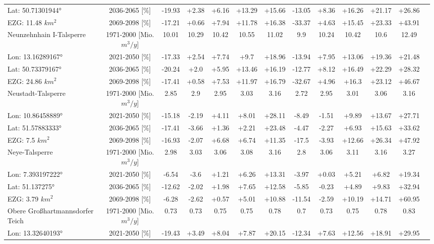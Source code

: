 \begin{longtable}{@{\extracolsep{\fill}}lc|ccccc||cccccc}
Lat: 50.71301944° & 2036-2065 [\%]  & -19.93 & +2.38 & +6.16 & +13.29 & +15.66 & -13.05 & +8.36 & +16.26 & +21.17 & +26.86 & \\ 
EZG: 11.48 $km^2$ & 2069-2098 [\%]  & -17.21 & +0.66 & +7.94 & +11.78 & +16.38 & -33.37 & +4.63 & +15.45 & +23.33 & +43.91 & \\ 
\hline 
Neunzehnhain I-Talsperre & 1971-2000 [Mio. $m^3/y$]  & 10.01 & 10.29 & 10.42 & 10.55 & 11.02 & 9.9 & 10.24 & 10.42 & 10.6 & 12.49 & \\ 
\cline{2-13} 
Lon: 13.16289167° & 2021-2050 [\%]  & -17.33 & +2.54 & +7.74 & +9.7 & +18.96 & -13.94 & +7.95 & +13.06 & +19.36 & +21.48 & \\ 
Lat: 50.73379167° & 2036-2065 [\%]  & -20.24 & +2.0 & +5.95 & +13.46 & +16.19 & -12.77 & +8.12 & +16.49 & +22.29 & +28.32 & \\ 
EZG: 24.86 $km^2$ & 2069-2098 [\%]  & -17.41 & +0.58 & +7.53 & +11.97 & +16.79 & -32.67 & +4.96 & +16.3 & +23.12 & +46.67 & \\ 
\hline 
Neustadt-Talsperre & 1971-2000 [Mio. $m^3/y$]  & 2.85 & 2.9 & 2.95 & 3.03 & 3.16 & 2.72 & 2.95 & 3.01 & 3.06 & 3.16 & \\ 
\cline{2-13} 
Lon: 10.86458889° & 2021-2050 [\%]  & -15.18 & -2.19 & +4.11 & +8.01 & +28.11 & -8.49 & -1.51 & +9.89 & +13.67 & +27.71 & \\ 
Lat: 51.57883333° & 2036-2065 [\%]  & -17.41 & -3.66 & +1.36 & +2.21 & +23.48 & -4.47 & -2.27 & +6.93 & +15.63 & +33.62 & \\ 
EZG: 7.5 $km^2$ & 2069-2098 [\%]  & -16.93 & -2.07 & +6.68 & +6.74 & +11.35 & -17.5 & -3.93 & +12.66 & +26.34 & +47.92 & \\ 
\hline 
Neye-Talsperre & 1971-2000 [Mio. $m^3/y$]  & 2.98 & 3.03 & 3.06 & 3.08 & 3.16 & 2.8 & 3.06 & 3.11 & 3.16 & 3.27 & \\ 
\cline{2-13} 
Lon: 7.393197222° & 2021-2050 [\%]  & -6.54 & -3.6 & +1.21 & +6.26 & +13.31 & -3.97 & +0.03 & +5.21 & +6.82 & +19.34 & \\ 
Lat: 51.137275° & 2036-2065 [\%]  & -12.62 & -2.02 & +1.98 & +7.65 & +12.58 & -5.85 & -0.23 & +4.89 & +9.83 & +32.94 & \\ 
EZG: 3.79 $km^2$ & 2069-2098 [\%]  & -6.28 & -2.62 & +0.57 & +5.01 & +10.88 & -11.54 & -2.59 & +10.19 & +14.71 & +60.95 & \\ 
\hline 
Obere Großhartmannsdorfer Teich & 1971-2000 [Mio. $m^3/y$]  & 0.73 & 0.73 & 0.75 & 0.75 & 0.78 & 0.7 & 0.73 & 0.75 & 0.78 & 0.83 & \\ 
\cline{2-13} 
Lon: 13.32640193° & 2021-2050 [\%]  & -19.43 & +3.49 & +8.04 & +7.87 & +20.15 & -12.34 & +7.63 & +12.56 & +18.91 & +29.95 & \\ 

\end{longtable}
